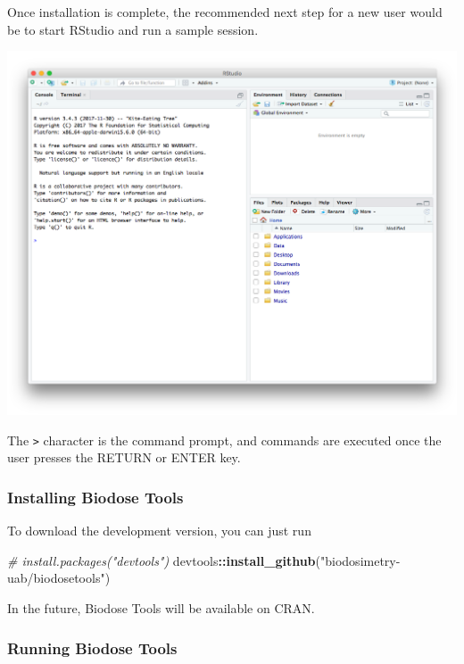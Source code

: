 \documentclass[]{scrartcl}
\newenvironment{Shaded}{\begin{snugshade}}{\end{snugshade}}
\newcommand{\CommentTok}[1]{\textcolor[rgb]{0.56,0.35,0.01}{\textit{#1}}}
\newcommand{\KeywordTok}[1]{\textcolor[rgb]{0.13,0.29,0.53}{\textbf{#1}}}
\newcommand{\NormalTok}[1]{#1}
\newcommand{\OperatorTok}[1]{\textcolor[rgb]{0.81,0.36,0.00}{\textbf{#1}}}
\newcommand{\StringTok}[1]{\textcolor[rgb]{0.31,0.60,0.02}{#1}}
\begin{document}
Once installation is complete, the recommended next step for a new user would be to start RStudio and run a sample session.

\begin{center}\includegraphics[width=0.9\linewidth]{images/user-manual/rstudio-mac} \end{center}

The \texttt{\textgreater{}} character is the command prompt, and commands are executed once the user
presses the RETURN or ENTER key.

\hypertarget{installing-biodose-tools}{%
\subsubsection{Installing Biodose Tools}\label{installing-biodose-tools}}

To download the development version, you can just run

\begin{Shaded}
\begin{Highlighting}[]
\CommentTok{# install.packages("devtools")}
\NormalTok{devtools}\OperatorTok{::}\KeywordTok{install_github}\NormalTok{(}\StringTok{"biodosimetry-uab/biodosetools"}\NormalTok{)}
\end{Highlighting}
\end{Shaded}

In the future, Biodose Tools will be available on CRAN.

\hypertarget{running-biodose-tools}{%
\subsubsection{Running Biodose Tools}\label{running-biodose-tools}}
\end{document}
